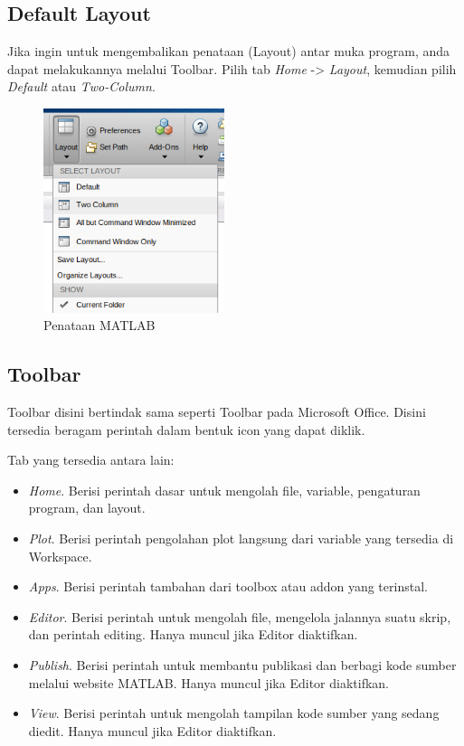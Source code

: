 \documentclass[12pt]{book}
\begin{document}
	\subsection{Default Layout}

	Jika ingin untuk mengembalikan penataan (Layout) antar muka program, anda dapat melakukannya melalui Toolbar.
	Pilih tab \textit{Home} -> \textit{Layout}, kemudian pilih \textit{Default} atau \textit{Two-Column}.

	\begin{figure}[!ht]
		\centering
		\includegraphics[width=150pt]{images/matlablayout}
		\caption{Penataan MATLAB}
	\end{figure}

	\subsection{Toolbar}
	Toolbar disini bertindak sama seperti Toolbar pada Microsoft Office.
	Disini tersedia beragam perintah dalam bentuk icon yang dapat diklik.

	\newpage
	Tab yang tersedia antara lain:
	\begin{itemize}
		\item \textit{Home}. Berisi perintah dasar untuk mengolah file, variable, pengaturan program, dan layout.
		\item \textit{Plot}. Berisi perintah pengolahan plot langsung dari variable yang tersedia di Workspace.
		\item \textit{Apps}. Berisi perintah tambahan dari toolbox atau addon yang terinstal.
		\item \textit{Editor}. Berisi perintah untuk mengolah file, mengelola jalannya suatu skrip, dan perintah editing.
		Hanya muncul jika Editor diaktifkan.
		\item \textit{Publish}. Berisi perintah untuk membantu publikasi dan berbagi kode sumber melalui website MATLAB.
		Hanya muncul jika Editor diaktifkan.
		\item \textit{View}. Berisi perintah untuk mengolah tampilan kode sumber yang sedang diedit.
		Hanya muncul jika Editor diaktifkan.
	\end{itemize}
\end{document}
